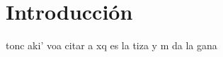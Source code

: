 \chapter*{Introducción}\label{chapter:introduction}

tonc aki' voa citar a \cite{elgamalthreshold} xq es la tiza y m da la gana